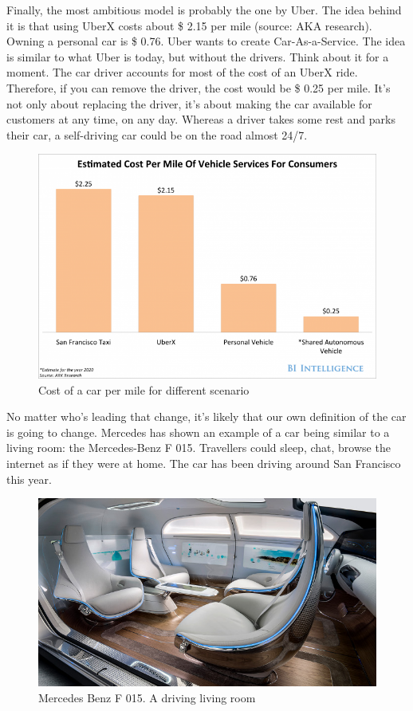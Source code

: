 \documentclass[12pt]{article}
\begin{document}
Finally, the most ambitious model is probably the one by Uber. The idea behind
it is that using UberX costs about \$ 2.15 per mile (source: AKA research).
Owning a personal car is \$ 0.76. Uber wants to create Car-As-a-Service.
The idea is similar to what Uber is today, but without the drivers. Think about
it for a moment. The car driver accounts for most of the cost of an UberX ride.
Therefore, if you can remove the driver, the cost would be \$ 0.25 per mile.
It's not only about replacing the driver, it's about making the car available
for customers at any time, on any day. Whereas a driver takes some rest and
parks their car, a self-driving car could be on the road almost 24/7.

\medskip

\begin{figure}[h]
    \centering
    \includegraphics[width=\linewidth]{vehicle-cost}
    \caption{Cost of a car per mile for different scenario}
    \label{fig:cost_of_car}
\end{figure}

\smallskip

No matter who's leading that change, it's likely that our own definition of the
car is going to change. Mercedes has shown an example of a car being similar to
a living room: the Mercedes-Benz F 015. Travellers could sleep, chat, browse the
internet as if they were at home. The car has been driving around San Francisco
this year.

\smallskip
\begin{figure}[h]
    \centering
    \includegraphics[width=\linewidth]{mercedes}
    \caption{Mercedes Benz F 015. A driving living room}
    \label{fig:cost_of_car}
\end{figure}
\end{document}
